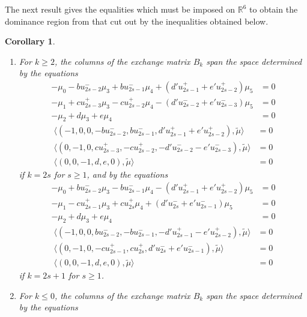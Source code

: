 \documentclass{amsart}
\newtheorem{corollary}[theorem]{Corollary}
\numberwithin{theorem}{section}
\newcommand{\RR}{\mathbb{R}}
\begin{document}
  The next result gives the equalities which must be imposed on $\RR^6$ to obtain the dominance region from that cut out by the inequalities obtained below.
  \begin{corollary}\mbox{}
    \begin{enumerate}
      \item For $k\ge2$, the columns of the exchange matrix $B_k$ span the space determined by the equations
        \begin{align*}
          -\mu_0 - b u_{2s-2}^- \mu_3 + b u_{2s-1}^- \mu_4 + (d' u_{2s-1}^+ + e' u_{2s-2}^+) \mu_5 &= 0\\
          -\mu_1 + c u_{2s-3}^+ \mu_3 - c u_{2s-2}^+ \mu_4 - (d' u_{2s-2}^- + e' u_{2s-3}^-) \mu_5 &= 0\\
          -\mu_2 + d \mu_3 + e \mu_4 &= 0
        \end{align*}
        \begin{align*}
          \langle (-1,0,0, -b u_{2s-2}^-, b u_{2s-1}^-, d' u_{2s-1}^+ + e' u_{2s-2}^+), \tilde\mu \rangle &= 0\\
          \langle (0,-1,0, c u_{2s-3}^+, -c u_{2s-2}^+, -d' u_{2s-2}^- - e' u_{2s-3}^-), \tilde\mu \rangle &= 0\\
          \langle (0,0,-1, d, e, 0),\tilde\mu \rangle &= 0
        \end{align*}
        if $k=2s$ for $s \ge 1$, and by the equations
        \begin{align*}
          -\mu_0 + b u_{2s-2}^- \mu_3 - b u_{2s-1}^- \mu_4 - (d' u_{2s-1}^+ + e' u_{2s-2}^+) \mu_5 &= 0\\
          -\mu_1 - c u_{2s-1}^+ \mu_3 + c u_{2s}^+ \mu_4 + (d' u_{2s}^- + e' u_{2s-1}^-) \mu_5 &= 0\\
          -\mu_2 + d \mu_3 + e \mu_4 &= 0
        \end{align*}
        \begin{align*}
          \langle (-1,0,0, b u_{2s-2}^-, -b u_{2s-1}^-, -d' u_{2s-1}^+ - e' u_{2s-2}^+), \tilde\mu \rangle &= 0\\
          \langle (0,-1,0, -c u_{2s-1}^+, c u_{2s}^+, d' u_{2s}^- + e' u_{2s-1}^-), \tilde\mu \rangle &= 0\\
          \langle (0,0,-1, d, e, 0), \tilde\mu \rangle &= 0
        \end{align*}
        if $k=2s+1$ for $s \ge 1$.
      \item For $k\le0$, the columns of the exchange matrix $B_k$ span the space determined by the equations
        \begin{align*}

\end{align*}
\end{enumerate}
\end{corollary}
\end{document}
